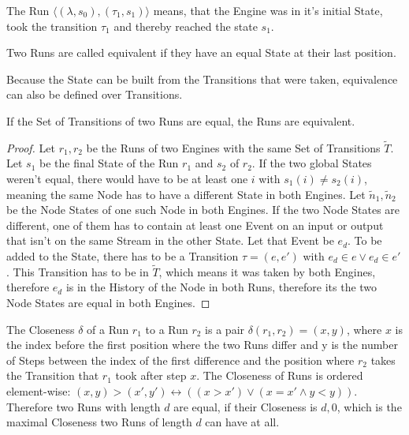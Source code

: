 The Run \(\langle (\lambda, s_0), (\tau_1, s_1) \rangle\) means, that the Engine was in it's initial State, took the transition \(\tau_1\) and thereby reached the state \(s_1\).

\begin{definition}[name = Equivalence of Runs]\label{def:equivalence_runs}
  Two Runs are called equivalent if they have an equal State at their last position.
\end{definition}

Because the State can be built from the Transitions that were taken, equivalence can also be defined over Transitions.

\begin{lemma}[name = Equivalence of Runs over Transitions]\label{lemma:equivalent_runs_with_transitions}
  If the Set of Transitions of two Runs are equal, the Runs are equivalent.
\end{lemma}

\begin{proof}
  Let \(r_1, r_2\) be the Runs of two Engines with the same Set of Transitions \(\widetilde{T}\).
  Let \(s_1\) be the final State of the Run \(r_1\) and \(s_2\) of \(r_2\).
  If the two global States weren't equal, there would have to be at least one \(i\) with \(s_1(i) \neq s_2(i)\), meaning the same Node has to have a different State in both Engines.
  Let \(\widetilde{n}_1, \widetilde{n}_2\) be the Node States of one such Node in both Engines.
  If the two Node States are different, one of them has to contain at least one Event on an input or output that isn't on the same Stream in the other State.
  Let that Event be \(e_d\).
  To be added to the State, there has to be a Transition \(\tau = (e, e')\) with \(e_d \in e \lor e_d \in e'\).
  This Transition has to be in \(\widetilde{T}\), which means it was taken by both Engines, therefore \(e_d\) is in the History of the Node in both Runs, therefore its the two Node States are equal in both Engines.
\end{proof}

\begin{definition}[name = Closeness of Runs]\label{def:runs_closeness}
  The Closeness \(\delta\) of a Run \(r_1\) to a Run \(r_2\) is a pair \(\delta(r_1,r_2) = (x,y)\), where \(x\) is the index before the first position where the two Runs differ and y is the number of Steps between the index of the first difference and the position where \(r_2\) takes the Transition that \(r_1\) took after step \(x\).
  The Closeness of Runs is ordered element-wise: \((x,y) > (x',y') \leftrightarrow ((x > x') \lor (x = x' \land y < y))\).
  Therefore two Runs with length \(d\) are equal, if their Closeness is \(d,0\), which is the maximal Closeness two Runs of length \(d\) can have at all.
\end{definition}

